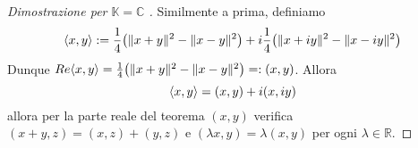 \begin{proof}[Dimostrazione per \(\mathbb{K}=\mathbb{C}\) ]
    Similmente a prima, definiamo 
    \[
      {\left\langle x,y\right\rangle} := \frac{1}{4}{\left( \|x+y\|^2 - \|x-y\|^2  \right)}+ i \frac{1}{4}{\left(  \|x+iy\|^2 - \|x-iy\|^2 \right)} 
    \]
    Dunque \(Re{\left\langle x,y\right\rangle} = \frac{1}{4}{\left( \|x+y\|^2 - \|x-y\|^2 \right)} =: (x,y) \). Allora 
    \[
      {\left\langle x,y\right\rangle} = (x,y) + i (x, iy)
    \]
    allora per la parte reale del teorema \({(x,y)}\) verifica \({(x+y, z)} = {(x,z)}+{(y,z)}\) e \({(\lambda x, y)} = \lambda {(x,y)}\) per ogni \(\lambda \in \mathbb{R}\).
\end{proof}




